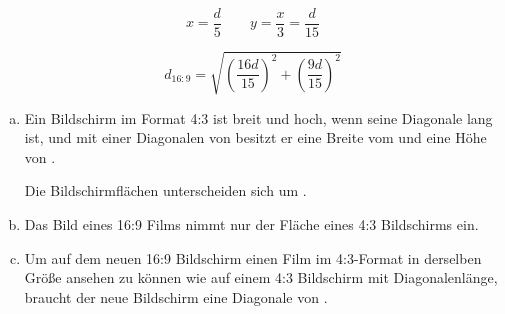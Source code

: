 \begin{exercise}
\begin{enumerate}[a)]
\begin{minipage}{6.2cm}
            \end{minipage}%
            \hfill
            \begin{minipage}{20em}
              \setlength{\abovedisplayskip}{0pt}%
              \begin{equation*}
                x=\frac{d}{5}
                \qquad
                y=\frac{x}{3}=\frac{d}{15}
              \end{equation*}\par
              \begin{equation*}
                d_{16:9}=
                  \sqrt{
                    \left(\frac{16d}{15}\right)^2
                    +
                    \left(\frac{9d}{15}\right)^2
                  }
              \end{equation*}
            \end{minipage}
    \end{enumerate}
  \fi
  \ifoutcome\outcome\par
    \begin{enumerate}[a)]
      \item Ein Bildschirm im Format 4:3 ist  breit und  hoch,
            wenn seine Diagonale  lang ist, und mit einer Diagonalen von
             besitzt er eine Breite vom  und eine Höhe von
            .\par
            Die Bildschirmflächen unterscheiden sich um .
      \item Das Bild eines 16:9 Films nimmt nur  der
            Fläche eines 4:3 Bildschirms ein.
      \item Um auf dem neuen 16:9 Bildschirm einen Film im 4:3-Format in derselben Größe
            ansehen zu können wie auf einem 4:3 Bildschirm mit  Diagonalenlänge,
            braucht der neue Bildschirm eine Diagonale von .
    \end{enumerate}
  \fi
\end{exercise}
